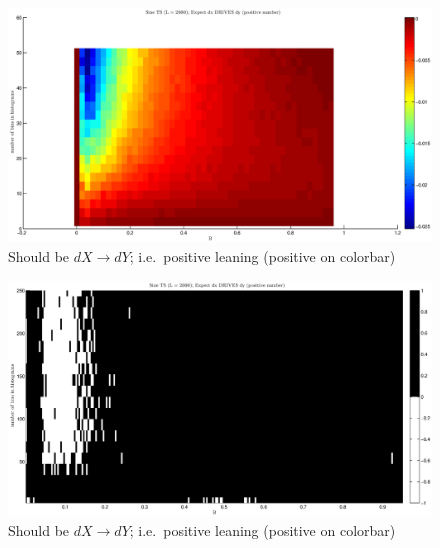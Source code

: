 \documentclass[a4paper,11pt]{article}
\begin{document}
\begin{figure}[!H]
\includegraphics[scale=0.55]{SineTSdxdy.eps}
\caption{Should be $dX\rightarrow dY$; i.e.\ positive leaning (positive on colorbar)}
\end{figure}
\begin{figure}[!H]
\includegraphics[scale=0.55]{SineTSdxdy_3C.eps}
\caption{Should be $dX\rightarrow dY$; i.e.\ positive leaning (positive on colorbar)}
\end{figure}
\end{document}
